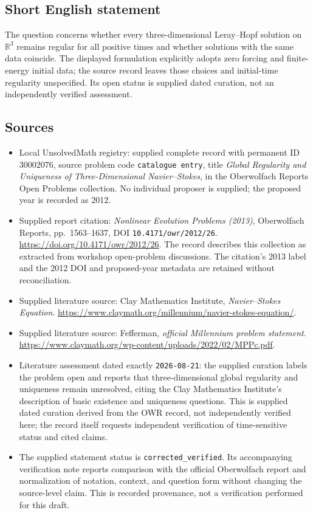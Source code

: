 \documentclass[11pt]{article}
\newcommand{\R}{\mathbb{R}}
\begin{document}
\subsection{Short English statement}
The question concerns whether every three-dimensional Leray--Hopf solution on \(\R^3\) remains regular for all positive times and whether solutions with the same data coincide. The displayed formulation explicitly adopts zero forcing and finite-energy initial data; the source record leaves those choices and initial-time regularity unspecified. Its open status is supplied dated curation, not an independently verified assessment.
\subsection{Sources}
\begin{itemize}
\item Local UnsolvedMath registry: supplied complete record with permanent ID \(30002076\), source problem code \texttt{catalogue entry}, title \emph{Global Regularity and Uniqueness of Three-Dimensional Navier--Stokes}, in the Oberwolfach Reports Open Problems collection. No individual proposer is supplied; the proposed year is recorded as 2012.
\item Supplied report citation: \emph{Nonlinear Evolution Problems (2013)}, Oberwolfach Reports, pp.\ 1563--1637, DOI \texttt{10.4171/owr/2012/26}. \url{https://doi.org/10.4171/owr/2012/26}. The record describes this collection as extracted from workshop open-problem discussions. The citation's 2013 label and the 2012 DOI and proposed-year metadata are retained without reconciliation.
\item Supplied literature source: Clay Mathematics Institute, \emph{Navier--Stokes Equation}. \url{https://www.claymath.org/millennium/navier-stokes-equation/}.
\item Supplied literature source: Fefferman, \emph{official Millennium problem statement}. \url{https://www.claymath.org/wp-content/uploads/2022/02/MPPc.pdf}.
\item Literature assessment dated exactly \texttt{2026-08-21}: the supplied curation labels the problem open and reports that three-dimensional global regularity and uniqueness remain unresolved, citing the Clay Mathematics Institute's description of basic existence and uniqueness questions. This is supplied dated curation derived from the OWR record, not independently verified here; the record itself requests independent verification of time-sensitive status and cited claims.
\item The supplied statement status is \texttt{corrected\_verified}. Its accompanying verification note reports comparison with the official Oberwolfach report and normalization of notation, context, and question form without changing the source-level claim. This is recorded provenance, not a verification performed for this draft.
\end{itemize}
\end{document}
